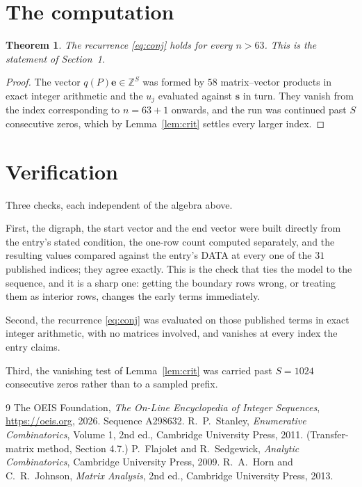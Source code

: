 \documentclass[11pt,a4paper]{article}
\theoremstyle{plain}
\newtheorem{theorem}{Theorem}
\theoremstyle{definition}
\begin{document}
\section{The computation}

\begin{theorem}
The recurrence \eqref{eq:conj} holds for every $n>63$. This is the statement of
Section~1.
\end{theorem}

\begin{proof}
The vector $q(P)\mathbf{e}\in\mathbb{Z}^{S}$ was formed by $58$ matrix--vector
products in exact integer arithmetic and the $u_j$ evaluated against $\mathbf{s}$ in turn.
They vanish from the index corresponding to $n=63+1$ onwards, and the run was continued
past $S$ consecutive zeros, which by Lemma~\ref{lem:crit} settles every larger index.
\end{proof}

\section{Verification}

Three checks, each independent of the algebra above.

First, the digraph, the start vector and the end vector were built directly from the
entry's stated condition, the one-row count computed separately, and the resulting values
compared against the entry's DATA at every one of the $31$ published indices; they
agree exactly. This is the check that ties the model to the sequence, and it is a sharp one:
getting the boundary rows wrong, or treating them as interior rows, changes the early terms
immediately.

Second, the recurrence \eqref{eq:conj} was evaluated on those published terms in exact
integer arithmetic, with no matrices involved, and vanishes at every index the entry claims.

Third, the vanishing test of Lemma~\ref{lem:crit} was carried past $S=1024$ consecutive
zeros rather than to a sampled prefix.

\begin{thebibliography}{9}
 The OEIS Foundation, \emph{The On-Line Encyclopedia of Integer
Sequences}, \url{https://oeis.org}, 2026. Sequence A298632.
 R.~P.~Stanley, \emph{Enumerative Combinatorics}, Volume 1, 2nd ed.,
Cambridge University Press, 2011. (Transfer-matrix method, Section 4.7.)
 P.~Flajolet and R.~Sedgewick, \emph{Analytic Combinatorics}, Cambridge
University Press, 2009.
 R.~A.~Horn and C.~R.~Johnson, \emph{Matrix Analysis}, 2nd ed., Cambridge
University Press, 2013.
\end{thebibliography}
\end{document}
